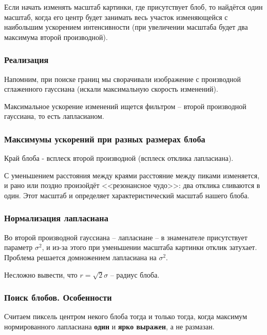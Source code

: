 \documentclass[main.tex]{subfiles}
\begin{document}
Если начать изменять масштаб картинки, где присутствует блоб, то найдётся один масштаб, когда его центр будет занимать весь участок изменяющейся с наибольшим ускорением интенсивности (при увеличении масштаба будет два максимума второй производной).

\subsubsection{Реализация}

Напомним, при поиске границ мы сворачивали изображение с производной сглаженного гауссиана (искали максимальную скорость изменений).

Максимальное ускорение изменений ищется фильтром -- второй производной гауссиана, то есть лапласианом.

\subsubsection{Максимумы ускорений при разных размерах блоба}

Край блоба - всплеск второй производной (всплеск отклика лапласиана).

С уменьшением расстояния между краями расстояние между пиками изменяется, и рано или поздно произойдёт <<резонансное чудо>>: два отклика сливаются в один.
Этот масштаб и определяет характеристический масштаб нашего блоба.

\subsubsection{Нормализация лапласиана}

Во второй производной гауссиана -- лапласиане -- в знаменателе присутствует параметр $ \sigma^2 $, и из-за этого при уменьшении масштаба картинки отклик затухает.
Проблема решается домножением лапласиана на $ \sigma^2 $.

\begin{leftbar}
	Несложно вывести, что $r = \sqrt 2 \sigma $ -- радиус блоба.
\end{leftbar}

\subsubsection{Поиск блобов. Особенности}

Считаем пиксель центром некого блоба тогда и только тогда, когда максимум нормированного лапласиана \textbf{один} и \textbf{ярко выражен}, а не размазан.
\end{document}
